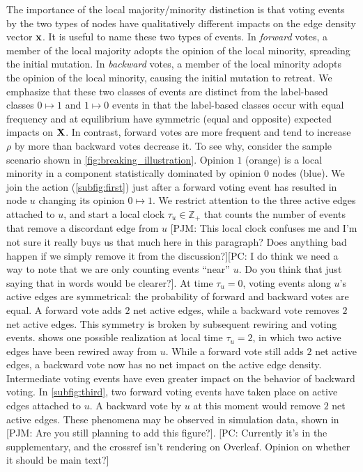 \documentclass[review, onefignum, onetabnum]{siamart171218}
\newcommand{\pjm}[1]{{\color{blue}[PJM: #1]}}
\newcommand{\pc}[1]{{\color{comment_purple}[PC: #1]}}
\begin{document}
		The importance of the local majority/minority distinction is that voting events by the two types of nodes have qualitatively different impacts on the edge density vector $\mathbf{x}$. 
		It is useful to name these two types of events. 
		In \emph{forward} votes, a member of the local majority adopts the opinion of the local minority, spreading the initial mutation. 
		In \emph{backward} votes, a member of the local minority adopts the opinion of the local minority, causing the initial mutation to retreat.  
		We emphasize that these two classes of events are distinct from the label-based classes $0\mapsto 1$ and $1 \mapsto 0$ events in that the label-based classes occur with equal frequency and at equilibrium have symmetric (equal and opposite) expected impacts on $\mathbf{X}$.
		In contrast, forward votes are more frequent and tend to increase $\rho$ by more than backward votes decrease it.  
		To see why, consider the sample scenario shown in \cref{fig:breaking_illustration}. 
		Opinion $1$ (orange) is a local minority in a component statistically dominated by opinion $0$ nodes (blue). 
		We join the action (\cref{subfig:first}) just after a forward voting event has resulted in node $u$ changing its opinion $0 \mapsto 1$. 
		We restrict attention to the three active edges attached to $u$, and start a local clock $\tau_u \in \mathbb{Z}_+$ that counts the number of events that remove a discordant edge from $u$ \pjm{This local clock confuses me and I'm not sure it really buys us that much here in this paragraph? Does anything bad happen if we simply remove it from the discussion?}\pc{I do think we need a way to note that we are only counting events ``near'' $u$. Do you think that just saying that in words would be clearer?}. 
		At time $\tau_u = 0$, voting events along $u$'s active edges are symmetrical: the probability of forward and backward votes are equal. 
		A forward vote adds $2$ net active edges, while a backward vote removes $2$ net active edges. 
		This symmetry is broken by subsequent rewiring and voting events.
		 shows one possible realization at local time $\tau_u = 2$, in which two active edges have been rewired away from $u$. 
		While a forward vote still adds $2$ net active edges, a backward vote now has no net impact on the active edge density. 
		Intermediate voting events have even greater impact on the behavior of backward voting. 
		In \cref{subfig:third}, two forward voting events have taken place on active edges attached to $u$. 
		A backward vote by $u$ at this moment would remove $2$ net active edges. 
		These phenomena may be observed in simulation data, shown in  \pjm{Are you still planning to add this figure?}. \pc{Currently it's in the supplementary, and the crossref isn't rendering on Overleaf. Opinion on whether it should be main text?}
		
\end{document}
